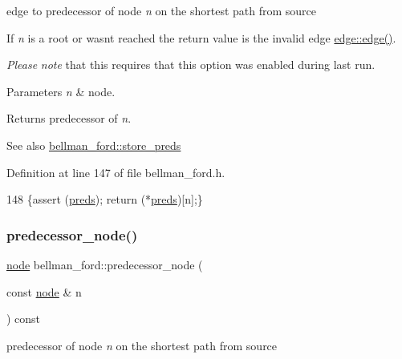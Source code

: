 edge to predecessor of node {\itshape n} on the shortest path from source 

If {\itshape n} is a root or wasn\textquotesingle{}t reached the return value is the invalid edge \mbox{\hyperlink{classedge_a746a705d37781374c8d5991abd1f7f58}{edge\+::edge()}}.

{\itshape Please} {\itshape note} that this requires that this option was enabled during last run.


\begin{DoxyParams}{Parameters}
{\em n} & node. \\
\hline
\end{DoxyParams}
\begin{DoxyReturn}{Returns}
predecessor of {\itshape n}. 
\end{DoxyReturn}
\begin{DoxySeeAlso}{See also}
\mbox{\hyperlink{classbellman__ford_aac87169a3cf4f95477ce215a0cb7a12b}{bellman\+\_\+ford\+::store\+\_\+preds}} 
\end{DoxySeeAlso}


Definition at line 147 of file bellman\+\_\+ford.\+h.


\begin{DoxyCode}
148     \{assert (\mbox{\hyperlink{classbellman__ford_a1ce37529c697ec5b89e8dc09204e4f59}{preds}}); \textcolor{keywordflow}{return} (*\mbox{\hyperlink{classbellman__ford_a1ce37529c697ec5b89e8dc09204e4f59}{preds}})[n];\}
\end{DoxyCode}
\mbox{\label{classbellman__ford_a403e286ec8cbe3c30a7a729c5041155e}} 
\subsubsection{\texorpdfstring{predecessor\+\_\+node()}{predecessor\_node()}}
{\footnotesize\ttfamily \mbox{\hyperlink{classnode}{node}} bellman\+\_\+ford\+::predecessor\+\_\+node (\begin{DoxyParamCaption}\item[{const \mbox{\hyperlink{classnode}{node}} \&}]{n }\end{DoxyParamCaption}) const\hspace{0.3cm}{\ttfamily [inline]}}



predecessor of node {\itshape n} on the shortest path from source 

